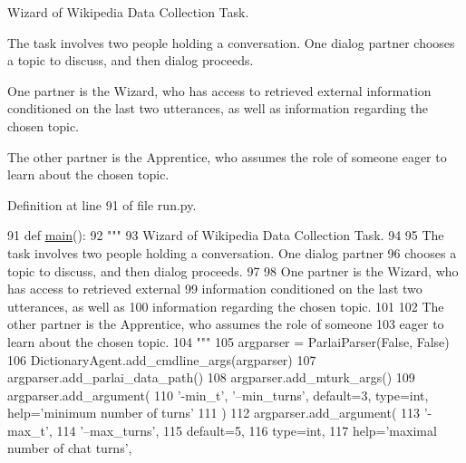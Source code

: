 \begin{DoxyVerb}Wizard of Wikipedia Data Collection Task.

The task involves two people holding a conversation. One dialog partner
chooses a topic to discuss, and then dialog proceeds.

One partner is the Wizard, who has access to retrieved external
information conditioned on the last two utterances, as well as
information regarding the chosen topic.

The other partner is the Apprentice, who assumes the role of someone
eager to learn about the chosen topic.
\end{DoxyVerb}
 

Definition at line 91 of file run.\+py.


\begin{DoxyCode}
91 \textcolor{keyword}{def }\hyperlink{namespaceprojects_1_1wizard__of__wikipedia_1_1mturk__evaluation__task_1_1run_ad3ab2c71f8083c3112815c0b363d316b}{main}():
92     \textcolor{stringliteral}{"""}
93 \textcolor{stringliteral}{    Wizard of Wikipedia Data Collection Task.}
94 \textcolor{stringliteral}{}
95 \textcolor{stringliteral}{    The task involves two people holding a conversation. One dialog partner}
96 \textcolor{stringliteral}{    chooses a topic to discuss, and then dialog proceeds.}
97 \textcolor{stringliteral}{}
98 \textcolor{stringliteral}{    One partner is the Wizard, who has access to retrieved external}
99 \textcolor{stringliteral}{    information conditioned on the last two utterances, as well as}
100 \textcolor{stringliteral}{    information regarding the chosen topic.}
101 \textcolor{stringliteral}{}
102 \textcolor{stringliteral}{    The other partner is the Apprentice, who assumes the role of someone}
103 \textcolor{stringliteral}{    eager to learn about the chosen topic.}
104 \textcolor{stringliteral}{    """}
105     argparser = ParlaiParser(\textcolor{keyword}{False}, \textcolor{keyword}{False})
106     DictionaryAgent.add\_cmdline\_args(argparser)
107     argparser.add\_parlai\_data\_path()
108     argparser.add\_mturk\_args()
109     argparser.add\_argument(
110         \textcolor{stringliteral}{'-min\_t'}, \textcolor{stringliteral}{'--min\_turns'}, default=3, type=int, help=\textcolor{stringliteral}{'minimum number of turns'}
111     )
112     argparser.add\_argument(
113         \textcolor{stringliteral}{'-max\_t'},
114         \textcolor{stringliteral}{'--max\_turns'},
115         default=5,
116         type=int,
117         help=\textcolor{stringliteral}{'maximal number of chat turns'},

\end{DoxyCode}
